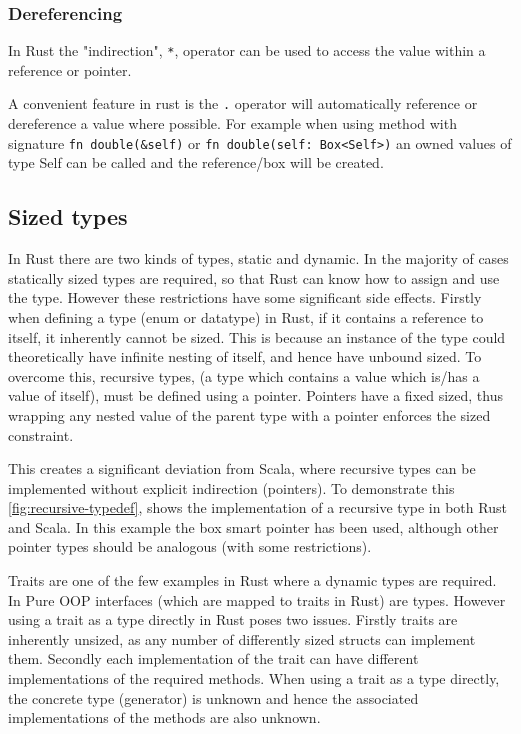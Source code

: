 \documentclass[ oneside,%
                    author={James Elgar},
                    degree={MEng},
                     title={Bidirectional transformer between functional and \\ object-oriented programming in Rust},
                  subtitle={}]{dissertation}
\newcommand{\rust}[1]{\texttt{#1}}
\begin{document}
\subsubsection{Dereferencing}

In Rust the "indirection", \rust{*}, operator can be used to access the value within a reference or pointer. 

A convenient feature in rust is the \rust{.} operator will automatically reference or dereference a value where possible. For example when using method with signature \rust{fn double(&self)} or \rust{fn double(self: Box<Self>)} an owned values of type Self can be called and the reference/box will be created.


\subsection{Sized types}
\label{sec:dyn}


In Rust there are two kinds of types, static and dynamic. In the majority of cases statically sized types are required, so that Rust can know how to assign and use the type. However these restrictions have some significant side effects. Firstly when defining a type (enum or datatype) in Rust, if it contains a reference to itself, it inherently cannot be sized. This is because an instance of the type could theoretically have infinite nesting of itself, and hence have unbound sized. To overcome this, recursive types, (a type which contains a value which is/has a value of itself), must be defined using a pointer. Pointers have a fixed sized, thus wrapping any nested value of the parent type with a pointer enforces the sized constraint.

This creates a significant deviation from Scala, where recursive types can be implemented without explicit indirection (pointers). To demonstrate this \autoref{fig:recursive-typedef}, shows the implementation of a recursive type in both Rust and Scala. In this example the box smart pointer has been used, although other pointer types should be analogous (with some restrictions).

Traits are one of the few examples in Rust where a dynamic types are required. In Pure OOP interfaces (which are mapped to traits in Rust) are types. However using a trait as a type directly in Rust poses two issues. Firstly traits are inherently unsized, as any number of differently sized structs can implement them. Secondly each implementation of the trait can have different implementations of the required methods. When using a trait as a type directly, the concrete type (generator) is unknown and hence the associated implementations of the methods are also unknown.
\end{document}
